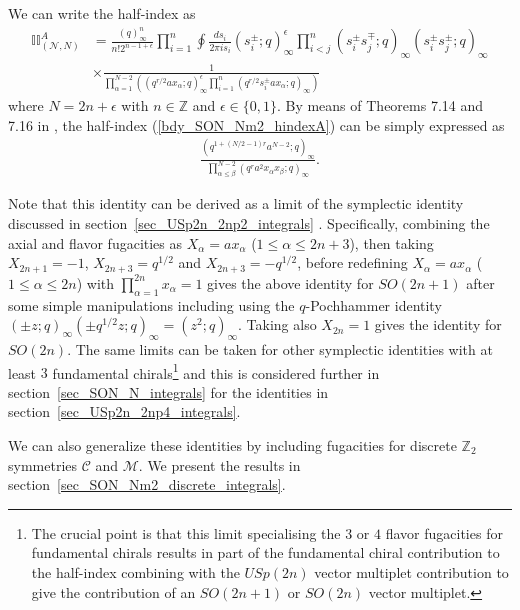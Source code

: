 \documentclass[12pt]{article}
\newcommand{\Zb}{\mathbb{Z}}
\numberwithin{equation}{section}
\begin{document}
We can write the half-index as
\begin{align}
\label{bdy_SON_Nm2_hindexA}
\mathbb{II}_{(\mathcal{N},N)}^{A}
&=
\frac{(q)_{\infty}^n}{n! 2^{n - 1 + \epsilon}} \prod_{i=1}^n \oint \frac{ds_i}{2\pi i s_i}
(s_i^{\pm}; q)_{\infty}^{\epsilon}
\prod_{i < j}^n (s_i^{\pm} s_j^{\mp}; q)_{\infty} (s_i^{\pm} s_j^{\pm}; q)_{\infty}
 \nonumber \\
& \times
\frac{1}{\prod_{\alpha = 1}^{N - 2} \left( (q^{r/2} a x_\alpha; q)_{\infty}^{\epsilon} \prod_{i = 1}^n (q^{r/2} s_i^{\pm} a x_\alpha; q)_{\infty} \right)}
\end{align}
where $N = 2n + \epsilon$ with $n \in \Zb$ and $\epsilon \in \{0, 1\}$. 
By means of Theorems 7.14 and 7.16 in \cite{MR1139492}, 
the half-index (\ref{bdy_SON_Nm2_hindexA}) can be simply expressed as
\begin{align}
\label{bdy_SON_Nm2_hindexB}
 \frac{\left( q^{1 + (N/2 - 1)r} a^{N-2}; q \right)_{\infty}}{\prod_{\alpha \le \beta}^{N-2} (q^r a^2 x_\alpha x_\beta; q)_{\infty}}. 
\end{align}

Note that this identity can be derived as a limit of the symplectic identity discussed in section~\ref{sec_USp2n_2np2_integrals} \cite{MR1139492}. Specifically, combining the axial and flavor fugacities as $X_{\alpha} = a x_{\alpha}$ ($1 \le \alpha \le 2n+3$), then taking $X_{2n+1} = -1$, $X_{2n+3} = q^{1/2}$ and $X_{2n+3} = -q^{1/2}$, before redefining $X_{\alpha} = a x_{\alpha}$ ($1 \le \alpha \le 2n$) with $\prod_{\alpha = 1}^{2n} x_{\alpha} = 1$ gives the above identity for $SO(2n+1)$ after some simple manipulations including using the $q$-Pochhammer identity $(\pm z; q)_{\infty} (\pm q^{1/2}z; q)_{\infty} = (z^2; q)_{\infty}$. Taking also $X_{2n} = 1$ gives the identity for $SO(2n)$. The same limits can be taken for other symplectic identities with at least $3$ fundamental chirals\footnote{The crucial point is that this limit specialising the $3$ or $4$ flavor fugacities for fundamental chirals results in part of the fundamental chiral contribution to the half-index combining with the $USp(2n)$ vector multiplet contribution to give the contribution of an $SO(2n+1)$ or $SO(2n)$ vector multiplet.} and this is considered further in section~\ref{sec_SON_N_integrals} for the identities in section~\ref{sec_USp2n_2np4_integrals}.

We can also generalize these identities by including fugacities for discrete
$\Zb_2$ symmetries $\mathcal{C}$ and $\mathcal{M}$. We present the results in section~\ref{sec_SON_Nm2_discrete_integrals}.
\end{document}
